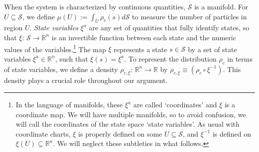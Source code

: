 \documentclass[12pt, english, twoside]{article} %
\begin{document}


When the system is characterized by continuous quantities, $\mathcal{S}$ is a manifold. For $U \subseteq \mathcal{S}$, we define $\mu(U) := \int_U \rho_c(s) d\mathcal{S}$ to measure the number of particles in region $U$. \textit{State variables} $\xi^a$ are any set of quantities that fully identify states, so that $\xi$: $\mathcal{S} \to \mathbb{R}^n$ is an invertible function between each state and the numeric values of the variables.\footnote{In the language of manifolds, these $\xi^a$ are called `coordinates' and $\xi$ is a coordinate map. We will have multiple manifolds, so to avoid confusion, we will call the coordinates of the state space `state variables'. As usual with coordinate charts, $\xi$ is properly defined on some $U \subseteq \mathcal{S}$, and $\xi^{-1}$ is defined on $\xi(U) \subseteq \mathbb{R}^n$. We will neglect these subtleties in what follows.} The map $\xi$ represents a state $s \in \mathcal{S}$ by a set of state variables $\xi^a \in \mathbb{R}^n$, such that $\xi (s) = \xi^a$. To represent the distribution $\rho_c$ in terms of state variables, we define a density $\rho_{c, \xi}$: $\mathbb{R}^n \to \mathbb{R}$ by $\rho_{c, \xi} \equiv (\rho_c \circ \xi^{-1})$. This density plays a crucial role throughout our argument. 
\end{document}
